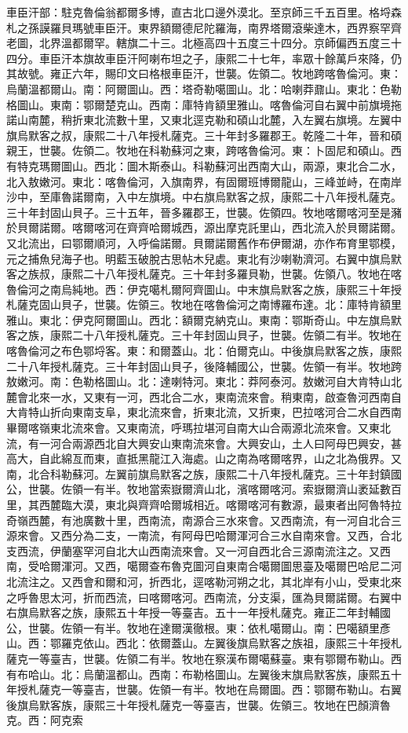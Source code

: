 \begin{pinyinscope}
車臣汗部：駐克魯倫翁都爾多博，直古北口邊外漠北。至京師三千五百里。格埒森札之孫謨羅貝瑪號車臣汗。東界額爾德尼陀羅海，南界塔爾滾柴達木，西界察罕齊老圖，北界溫都爾罕。轄旗二十三。北極高四十五度三十四分。京師偏西五度三十四分。車臣汗本旗故車臣汗阿喇布坦之子，康熙二十七年，率眾十餘萬戶來降，仍其故號。雍正六年，賜印文曰格根車臣汗，世襲。佐領二。牧地跨喀魯倫河。東：烏蘭溫都爾山。南：阿爾圖山。西：塔奇勒噶圖山。北：哈喇莽鼐山。東北：色勒格圖山。東南：鄂爾楚克山。西南：庫特肯額里雅山。喀魯倫河自右翼中前旗境拖諾山南麓，稍折東北流數十里，又東北逕克勒和碩山北麓，入左翼右旗境。左翼中旗烏默客之叔，康熙二十八年授札薩克。三十年封多羅郡王。乾隆二十年，晉和碩親王，世襲。佐領二。牧地在科勒蘇河之東，跨喀魯倫河。東：卜固尼和碩山。西有特克瑪爾圖山。西北：圖木斯泰山。科勒蘇河出西南大山，兩源，東北合二水，北入敖嫩河。東北：喀魯倫河，入旗南界，有固爾班博爾龍山，三峰並峙，在南岸沙中，至庫魯諾爾南，入中左旗境。中右旗烏默客之叔，康熙二十八年授札薩克。三十年封固山貝子。三十五年，晉多羅郡王，世襲。佐領四。牧地喀爾喀河至是瀦於貝爾諾爾。喀爾喀河在齊齊哈爾城西，源出摩克託里山，西北流入於貝爾諾爾。又北流出，曰鄂爾順河，入呼倫諾爾。貝爾諾爾舊作布伊爾湖，亦作布育里鄂模，元之捕魚兒海子也。明藍玉破脫古思帖木兒處。東北有沙喇勒濟河。右翼中旗烏默客之族叔，康熙二十八年授札薩克。三十年封多羅貝勒，世襲。佐領八。牧地在喀魯倫河之南烏純地。西：伊克噶札爾阿齊圖山。中末旗烏默客之族，康熙三十年授札薩克固山貝子，世襲。佐領三。牧地在喀魯倫河之南博羅布達。北：庫特肯額里雅山。東北：伊克阿爾圖山。西北：額爾克納克山。東南：鄂斯奇山。中左旗烏默客之族，康熙二十八年授札薩克。三十年封固山貝子，世襲。佐領二有半。牧地在喀魯倫河之布色鄂埒客。東：和爾蓋山。北：伯爾克山。中後旗烏默客之族，康熙二十八年授札薩克。三十年封固山貝子，後降輔國公，世襲。佐領一有半。牧地跨敖嫩河。南：色勒格圖山。北：達喇特河。東北：莽阿泰河。敖嫩河自大肯特山北麓會北來一水，又東有一河，西北合二水，東南流來會。稍東南，啟查魯河西南自大肯特山折向東南支阜，東北流來會，折東北流，又折東，巴拉喀河合二水自西南畢爾喀嶺東北流來會。又東南流，呼瑪拉堪河自南大山合兩源北流來會。又東北流，有一河合兩源西北自大興安山東南流來會。大興安山，土人曰阿母巴興安，甚高大，自此綿亙而東，直抵黑龍江入海處。山之南為喀爾喀界，山之北為俄界。又南，北合科勒蘇河。左翼前旗烏默客之族，康熙二十八年授札薩克。三十年封鎮國公，世襲。佐領一有半。牧地當索嶽爾濟山北，濱喀爾喀河。索嶽爾濟山袤延數百里，其西麓臨大漠，東北與齊齊哈爾城相近。喀爾喀河有數源，最東者出阿魯特拉奇嶺西麓，有池廣數十里，西南流，南源合三水來會。又西南流，有一河自北合三源來會。又西分為二支，一南流，有阿母巴哈爾渾河合三水自南來會。又西，合北支西流，伊蘭塞罕河自北大山西南流來會。又一河自西北合三源南流注之。又西南，受哈爾渾河。又西，噶爾查布魯克圖河自東南合噶爾圖思臺及噶爾巴哈尼二河北流注之。又西會和爾和河，折西北，逕喀勒河朔之北，其北岸有小山，受東北來之呼魯思太河，折而西流，曰喀爾喀河。西南流，分支渠，匯為貝爾諾爾。右翼中右旗烏默客之族，康熙五十年授一等臺吉。五十一年授札薩克。雍正二年封輔國公，世襲。佐領一有半。牧地在達爾漢徹根。東：依札噶爾山。南：巴噶額里彥山。西：鄂羅克依山。西北：依爾蓋山。左翼後旗烏默客之族祖，康熙三十年授札薩克一等臺吉，世襲。佐領二有半。牧地在察漢布爾噶蘇臺。東有鄂爾布勒山。西有布哈山。北：烏蘭溫都山。西南：布勒格圖山。左翼後末旗烏默客族，康熙五十年授札薩克一等臺吉，世襲。佐領一有半。牧地在烏爾圖。西：鄂爾布勒山。右翼後旗烏默客族，康熙三十年授札薩克一等臺吉，世襲。佐領三。牧地在巴顏濟魯克。西：阿克索
\end{pinyinscope}
